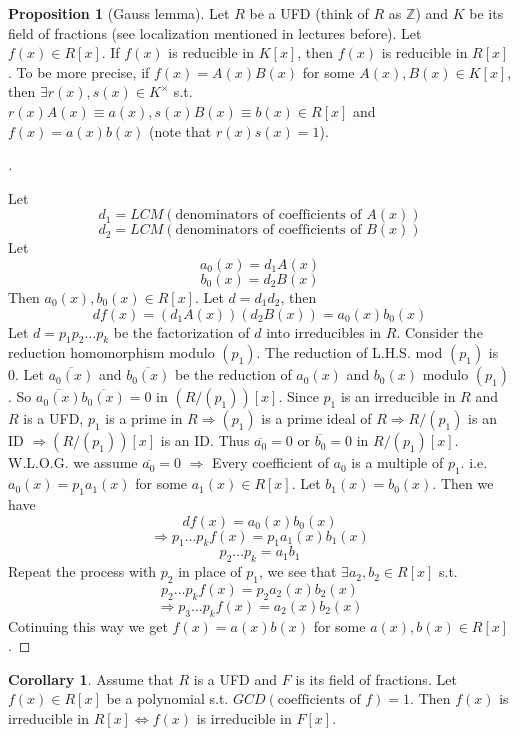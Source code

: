 \documentclass{article}
\theoremstyle{definition}
\newtheorem{cor}{Corollary}
\newtheorem{prop}{Proposition}
\newenvironment{proofs}[1][\proofname]{%
  \begin{proof}[#1]$ $\par\nobreak\ignorespaces
}{%
  \end{proof}
}
\begin{document}
  \begin{prop}[Gauss lemma]
	Let $R$ be a UFD (think of $R$ as $\mathbb{Z}$) and $K$ be its field of fractions (see localization mentioned in lectures before). Let $f(x) \in R[x]$. If $f(x)$ is reducible in $K[x]$, then $f(x)$ is reducible in $R[x]$. To be more precise, if $f(x) = A(x) B(x)$ for some $A(x), B(x) \in K[x]$, then $\exists r(x), s(x) \in K^\times$ s.t. $r(x) A(x) \equiv a(x), s(x) B(x) \equiv b(x) \in R[x]$  and $f(x) = a(x) b(x)$ (note that $r(x) s(x) = 1$).
  \end{prop}
  
  \begin{proofs}
	Let 
	$$d_1 = LCM(\text{denominators of coefficients of } A(x))$$
	$$d_2 = LCM(\text{denominators of coefficients of } B(x))$$
	Let 
	$$a_0(x) = d_1 A(x)$$
	$$b_0(x) = d_2 B(x)$$
	Then $a_0(x), b_0(x) \in R[x]$. Let $d = d_1 d_2$, then 
	$$d f(x) = (d_1 A(x)) (d_2 B(x))  = a_0(x) b_0(x)$$
	Let $d = p_1 p_2 \hdots p_k$ be the factorization of $d$ into irreducibles in $R$. Consider the reduction homomorphism modulo $(p_1)$. The reduction of L.H.S. mod $(p_1)$ is 0. Let $\overline{a_0(x)}$ and $\overline{b_0(x)}$ be the reduction of $a_0(x)$ and $b_0(x)$ modulo $(p_1)$. So $\overline{a_0(x)} \overline{b_0(x)} = 0$ in $(R/(p_1))[x]$. Since $p_1$ is an irreducible in $R$ and $R$ is a UFD, $p_1$ is a prime in $R \Rightarrow (p_1)$ is a prime ideal of $R \Rightarrow R/(p_1)$ is an ID $\Rightarrow (R/(p_1))[x]$ is an ID. Thus $\overline{a_0} = 0$ or $\overline{b_0} = 0$ in $R/(p_1)[x]$. W.L.O.G. we assume $\overline{a_0} = 0$ $\Rightarrow$ Every coefficient of $a_0$ is a multiple of $p_1$. i.e. $a_0(x) = p_1 a_1(x)$ for some $a_1(x) \in R[x]$. Let $b_1(x) = b_0(x)$. Then we have 
	$$d f(x) = a_0(x) b_0(x)$$
	$$\Rightarrow p_1 \hdots p_k f(x) = p_1 a_1(x) b_1(x)$$
	$$p_2 \hdots p_k = a_1 b_1$$
	Repeat the process with $p_2$ in place of $p_1$, we see that $\exists a_2, b_2 \in R[x]$ s.t. 
	$$p_2 \hdots p_k f(x) = p_2 a_2(x) b_2(x)$$
	$$\Rightarrow p_3 \hdots p_k f(x) = a_2(x) b_2(x)$$ 
	Cotinuing this way we get $f(x) = a(x) b(x)$ for some $a(x), b(x) \in R[x]$. 
  \end{proofs}

  \begin{cor}
	Assume that $R$ is a UFD and $F$ is its field of fractions. Let $f(x) \in R[x]$ be a polynomial s.t. $GCD(\text{coefficients of }f) = 1$. Then $f(x)$ is irreducible in $R[x] \Leftrightarrow f(x)$ is irreducible in $F[x]$. 
  \end{cor}
  
\end{document}
